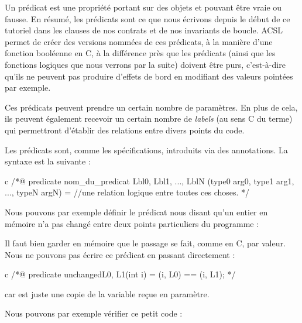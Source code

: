 Un prédicat est une propriété portant sur des objets et pouvant être vraie ou
fausse. En résumé, les prédicats sont ce que nous écrivons depuis le début de
ce tutoriel dans les clauses de nos contrats et de nos invariants de boucle.
ACSL permet de créer des versions nommées de ces prédicats, à la manière
d'une fonction booléenne en C, à la différence près que
les prédicats (ainsi que les fonctions logiques que nous verrons par la suite)
doivent être purs, c'est-à-dire qu'ils ne peuvent pas produire d'effets de
bord en modifiant des valeurs pointées par exemple.



Ces prédicats peuvent prendre un certain nombre de paramètres. En plus de cela,
ils peuvent également recevoir un certain nombre de \textit{labels} (au sens C du terme)
qui permettront d'établir des relations entre divers points du code.





Les prédicats sont, comme les spécifications, introduits via des
annotations. La syntaxe est la suivante :



\begin{CodeBlock}{c}
  /*@
  predicate nom_du_predicat { Lbl0, Lbl1, ..., LblN }(type0 arg0, type1 arg1, ..., typeN argN) =
  //une relation logique entre toutes ces choses.
  */
\end{CodeBlock}



Nous pouvons par exemple définir le prédicat nous disant qu'un entier en mémoire n'a
pas changé entre deux points particuliers du programme :




\begin{Warning}
  Il faut bien garder en mémoire que le passage se fait, comme en C, par valeur.
  Nous ne pouvons pas écrire ce prédicat en passant directement  :
  \begin{CodeBlock}{c}
/*@
  predicate unchanged{L0, L1}(int i) =
    \at(i, L0) == \at(i, L1);
*/
\end{CodeBlock}
  car  est juste une copie de la variable reçue en paramètre.
\end{Warning}


Nous pouvons par exemple vérifier ce petit code :





